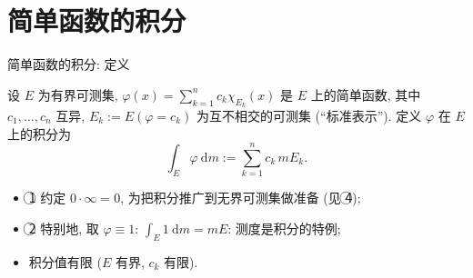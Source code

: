 
\section[简单函数]{简单函数的积分}


\begin{frame}{简单函数的积分: 定义}

\begin{Def}[简单函数的积分]
设 $E$ 为\alert{有界}可测集, $\varphi(x) = \sum_{k=1}^{n} c_k \chi_{E_k}(x)$ 是 $E$ 上的简单函数,
其中 $c_1, \dots, c_n$ 互异, $E_k := E(\varphi = c_k)$ 为互不相交的可测集 (``标准表示'').
定义 $\varphi$ 在 $E$ 上的\alert{积分}为
\[
\int_E \varphi ~ \mathrm{d} m := \sum_{k=1}^{n} c_k\, m E_k .
\]
\end{Def}

\pause

\begin{itemize}
\item \textcircled{1} 约定 $0 \cdot \infty = 0$, 为把积分推广到\alert{无界}可测集做准备 (见 \textcircled{4});
\item \textcircled{2} 特别地, 取 $\varphi \equiv 1$: $\int_E 1 ~ \mathrm{d} m = mE$:
  \alert{测度是积分的特例};
\item 积分值有限 ($E$ 有界, $c_k$ 有限).
\end{itemize}

\end{frame}


